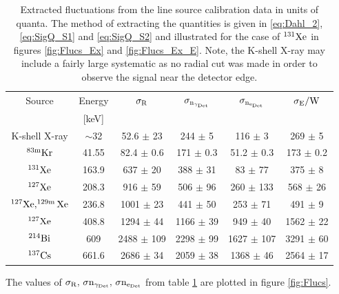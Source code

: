 \renewcommand{\baselinestretch}{1}
\small\normalsize
\begin{table}[h!]
\begin{center}
\begin{tabular}{|c|c|c|c|c|c|} \hline
Source & Energy & $\rm \sigma_R$ &  $\rm \sigma_{n_{\gamma_{Det}}}$ &  $\rm \sigma_{n_{e_{Det}}}$ & $\rm \sigma_E/W$  \\
& [keV] & & & & \\ [0.5ex] %
\hline
K-shell X-ray 				& $\sim$32 	 &  52.6 $\pm$ 23 		& 244 $\pm$ 5		& 116 $\pm$ 3 		 & 269 $\pm$ 5						\\ \hline
 $\rm ^{83m}Kr$ 				& 41.55		& 82.4	$\pm$ 0.6			& 171 $\pm$ 0.3		& 51.2 $\pm$	0.3		& 173 $\pm$ 0.2				\\ \hline
 $\rm ^{131}Xe$ 				& 163.9		& 637 $\pm$ 20			& 388	$\pm$ 31		& 83 $\pm$ 77		& 375 $\pm$ 8				\\ \hline
$\rm ^{127}Xe$ 				& 208.3 		& 916	$\pm$ 59			& 506	$\pm$ 96 		& 260 $\pm$ 133	 	& 568 $\pm$ 26			\\ \hline
$\rm ^{127}Xe, ^{129m}Xe$	 & 236.8		& 1001 $\pm$ 23			& 441	$\pm$ 50		& 253 $\pm$ 71		& 491 $\pm$ 9				\\ \hline
$\rm ^{127}Xe$			  	 & 408.8		& 1294 $\pm$ 44			& 1166	 $\pm$ 39		& 949 $\pm$ 40		& 1562 $\pm$ 22			\\ \hline
$\rm ^{214}Bi	$				& 609 			& 2488 $\pm$ 109		& 2298 $\pm$ 99		& 1627 $\pm$ 107	& 3291 $\pm$ 60				 \\ \hline
$\rm ^{137}Cs$				& 661.6		& 2686 $\pm$ 34			& 2059 $\pm$ 38		& 1368 $\pm$ 46		& 2564 $\pm$ 17				\\ [0.5ex] 
\hline
\end{tabular}
\caption{ Extracted fluctuations from the line source calibration data in units of quanta. The method of extracting the quantities is given in \ref{eq:Dahl_2}, \ref{eq:SigQ_S1} and \ref{eq:SigQ_S2} and illustrated for the case of  $\rm ^{131}Xe$ in figures \ref{fig:Flucs_Ex} and \ref{fig:Flucs_Ex_E}. Note, the K-shell X-ray may include a fairly large systematic as no radial cut was made in order to observe the signal near the detector edge.}
\label{table:Line_Data}
\end{center}
\end{table}
\renewcommand{\baselinestretch}{2}
\small\normalsize

\noindent The values of $\rm \sigma_R, \, \sigma n_{\gamma_{Det}}, \,\sigma n_{e_{Det}} $ from table \ref{table:Line_Data} are plotted in figure \ref{fig:Flucs}.

